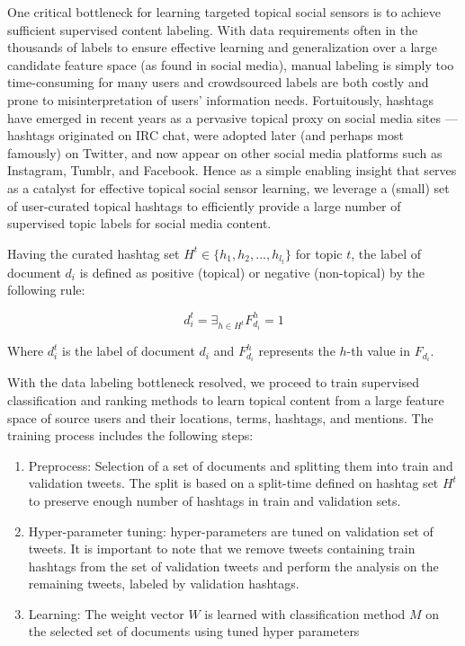 One critical bottleneck for learning targeted topical social sensors
is to achieve sufficient supervised content labeling.  With data
requirements often in the thousands of labels to ensure effective
learning and generalization over a large candidate feature space (as
found in social media), manual labeling is simply too time-consuming
for many users and crowdsourced labels are both costly and prone to
misinterpretation of users' information needs.  Fortuitously, hashtags
have emerged in recent years as a pervasive topical proxy on social
media sites --- hashtags originated on IRC chat, were adopted later
(and perhaps most famously) on Twitter, and now appear on other social
media platforms such as Instagram, Tumblr, and Facebook.  Hence as a
simple enabling insight that serves as a catalyst for effective
topical social sensor learning, we leverage a (small) set of
user-curated topical hashtags to efficiently provide a large number of
supervised topic labels for social media content.

Having the curated hashtag set $H^{t} \in \{h_{1}, h_{2},...,h_{l_{t}} \}$ for topic $t$, the label of document $d_{i}$ is defined as positive (topical) or negative (non-topical) by the following rule:

\begin{equation}
d_{i}^{t} = \exists _{h \in H^{t}} F_{d_{i}}^{h} = 1
\end{equation}

Where $d_{i}^{t}$ is the label of document $d_{i}$ and $F_{d_{i}}^{h}$ represents the $h$-th value in $F_{d_{i}}$.

With the data labeling bottleneck resolved, we proceed to train
supervised classification and ranking methods to learn topical content
from a large feature space of source users and their locations, terms,
hashtags, and mentions. The training process includes the following steps:%

\begin{enumerate}
\item Preprocess: Selection of a set of documents and splitting them into train and validation tweets. The split is based on a split-time defined on hashtag set $H^{t}$ to preserve enough number of hashtags in train and validation sets.
\item Hyper-parameter tuning: hyper-parameters are tuned on validation set of tweets. It is important to note that we remove tweets containing train hashtags from the set of validation tweets and perform the analysis on the remaining tweets, labeled by validation hashtags.
\item Learning: The weight vector $W$ is learned with classification method $M$ on the selected set of documents using tuned hyper parameters
\end{enumerate}
